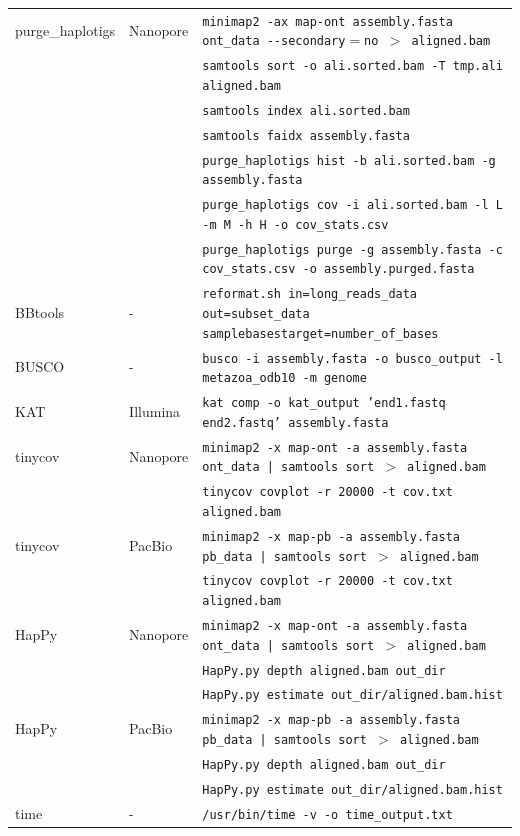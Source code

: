 \begin{suppsection}
\begin{table}[ht]
{\begin{tabular}{lll}
purge\_haplotigs & Nanopore & \texttt{minimap2 -ax map-ont assembly.fasta ont\_data -{}-secondary$=$no $>$ aligned.bam}\\
    & & \texttt{samtools sort -o ali.sorted.bam -T tmp.ali aligned.bam} \\
    & & \texttt{samtools index ali.sorted.bam} \\
    & & \texttt{samtools faidx assembly.fasta} \\
    & & \texttt{purge\_haplotigs hist -b ali.sorted.bam -g assembly.fasta} \\
    & & \texttt{purge\_haplotigs cov -i ali.sorted.bam -l L -m M -h H -o cov\_stats.csv}\\
    & & \texttt{purge\_haplotigs purge -g assembly.fasta -c cov\_stats.csv -o assembly.purged.fasta}\\
BBtools & - & \texttt{reformat.sh in=long\_reads\_data out=subset\_data samplebasestarget=number\_of\_bases} \\
BUSCO & - & \texttt{busco -i assembly.fasta -o busco\_output -l metazoa\_odb10 -m genome} \\
KAT & Illumina & \texttt{kat comp -o kat\_output 'end1.fastq end2.fastq' assembly.fasta} \\
tinycov & Nanopore & \texttt{minimap2 -x map-ont -a assembly.fasta ont\_data | samtools sort $>$ aligned.bam} \\
    & & \texttt{tinycov covplot -r 20000 -t cov.txt aligned.bam} \\
tinycov & PacBio & \texttt{minimap2 -x map-pb -a assembly.fasta pb\_data | samtools sort $>$ aligned.bam} \\
    & & \texttt{tinycov covplot -r 20000 -t cov.txt aligned.bam} \\
HapPy & Nanopore & \texttt{minimap2 -x map-ont -a assembly.fasta ont\_data | samtools sort $>$ aligned.bam} \\
    & & \texttt{HapPy.py depth aligned.bam out\_dir} \\
    & & \texttt{HapPy.py estimate out\_dir/aligned.bam.hist} \\
HapPy & PacBio & \texttt{minimap2 -x map-pb -a assembly.fasta pb\_data | samtools sort $>$ aligned.bam} \\
    & & \texttt{HapPy.py depth aligned.bam out\_dir} \\
    & & \texttt{HapPy.py estimate out\_dir/aligned.bam.hist} \\
time & - & \texttt{/usr/bin/time -v -o time\_output.txt}\\
\hline
\end{tabular}
}
\label{tab:command_lines}
\end{table}


\end{suppsection}
